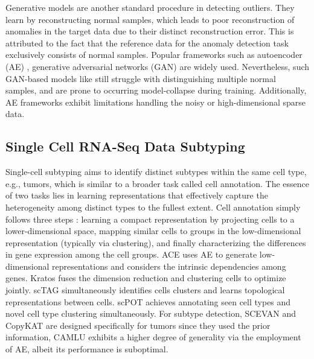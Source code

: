 \documentclass{article}
\begin{document}
Generative models are another standard procedure in detecting outliers. They learn by 
reconstructing normal samples, which leads to poor reconstruction of anomalies in 
the target data due to their distinct reconstruction error. This is attributed to the 
fact that the reference data for the anomaly detection task exclusively consists of 
normal samples.
Popular frameworks such as autoencoder (AE) \cite{odae}, generative adversarial 
networks (GAN) \cite{GANad} are widely used. Nevertheless, such GAN-based 
models like \cite{EffGAN} still struggle with distinguishing multiple normal samples, and are prone to 
occurring model-collapse during training. Additionally, AE frameworks exhibit limitations 
handling the noisy or high-dimensional sparse data.

\subsection{Single Cell RNA-Seq Data Subtyping}
Single-cell subtyping aims to identify distinct subtypes within the same cell type, e.g., 
tumors, which is similar to a broader task called cell annotation. The essence of two 
tasks lies in learning representations that effectively capture the heterogeneity among 
distinct types to the fullest extent. Cell annotation simply follows three 
steps \cite{threestep}: learning a compact representation by projecting cells to a 
lower-dimensional space, mapping similar cells to groups in the low-dimensional 
representation (typically via clustering), and finally characterizing the differences in 
gene expression among the cell groups. ACE \cite{ACE} uses AE to generate 
low-dimensional representations and considers the intrinsic dependencies among genes. 
Kratos \cite{kratos} fuses the dimension reduction and clustering cells to 
optimize jointly. scTAG \cite{scTAG} simultaneously identifies cells clusters and 
learns topological representations between cells. scPOT \cite{scPOT} achieves 
annotating seen cell types and novel cell type clustering simultaneously. For subtype 
detection, SCEVAN \cite{SCEVAN} and CopyKAT \cite{CopyKAT} are designed 
specifically for tumors since they used the prior information, CAMLU \cite{CAMLU} 
exhibits a higher degree of generality via the employment of AE, albeit its performance is suboptimal. 
\end{document}
